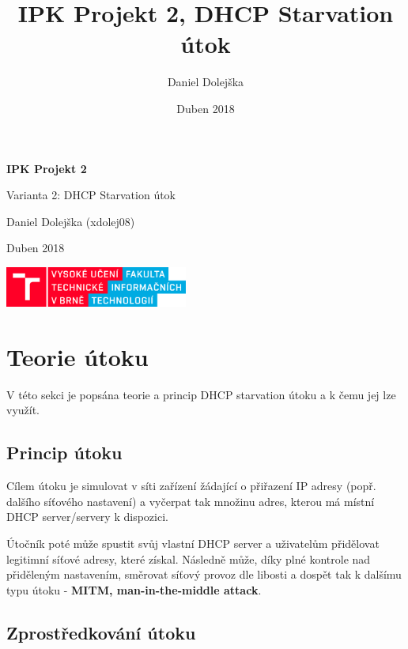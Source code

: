 \documentclass[a4paper,11pt]{article}
\title{IPK Projekt 2, DHCP Starvation útok}
\author{Daniel Dolejška}
\date{Duben 2018}
\begin{document}
\begin{titlepage}
\centering

\huge\textbf{IPK Projekt 2}

\vspace{5mm}

\large Varianta 2: DHCP Starvation útok

\vfill

\large Daniel Dolejška \textsf{(xdolej08)}

\vspace{2mm}

\small Duben 2018

\vspace{1cm}

\includegraphics[width=6cm]{vutbr-fit.png}

\end{titlepage}

\newpage
\tableofcontents
\listoffigures


\newpage
\section{Teorie útoku} \label{teorie}

V této sekci je popsána teorie a princip DHCP starvation útoku a k čemu jej lze využít.

\subsection{Princip útoku}

Cílem útoku je simulovat v síti zařízení žádající o přiřazení IP adresy (popř. dalšího síťového nastavení) a vyčerpat tak množinu adres, kterou má místní DHCP server/servery k dispozici.

\vspace{2mm}
Útočník poté může spustit svůj vlastní DHCP server a uživatelům přidělovat legitimní síťové adresy, které získal. Následně může, díky plné kontrole nad přiděleným nastavením, směrovat síťový provoz dle libosti a dospět tak k dalšímu typu útoku - \textbf{MITM, man-in-the-middle attack}.

\subsection{Zprostředkování útoku}
\end{document}
